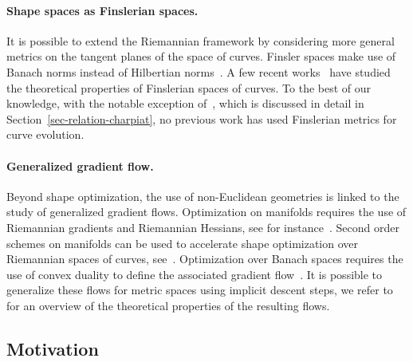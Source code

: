\paragraph{Shape spaces as Finslerian spaces.}

It is possible to extend the Riemannian framework by considering more general metrics on the tangent planes of the space of curves. Finsler spaces make use of Banach norms instead of Hilbertian norms~\cite{RF-geometry}. A few recent works~\cite{Mennucci-CIME,Yezzi-Menn-2005a} have studied the theoretical properties of Finslerian spaces of curves. To the best of our knowledge, with the notable exception of~\cite{charpiat-generalized-gradient}, which is discussed in detail in Section~\ref{sec-relation-charpiat}, no previous work has used Finslerian metrics for curve evolution.   


\paragraph{Generalized gradient flow.}

Beyond shape optimization, the use of non-Euclidean geometries is linked to the study of generalized gradient flows. Optimization on manifolds requires the use of Riemannian gradients and Riemannian Hessians, see for instance~\cite{Opt-manifolds}. Second order schemes on manifolds can be used to accelerate shape optimization over Riemannian spaces of curves, see~\cite{Ring-opti-manifolds}. Optimization over Banach spaces requires the use of convex duality to define the associated gradient flow~\cite{Ulbrich,prox-banach-1,prox-banach-2}. It is possible to generalize these flows for metric spaces using implicit descent steps, we refer to~\cite{AGS} for an overview of the theoretical properties of the resulting flows.


\subsection{Motivation} 

